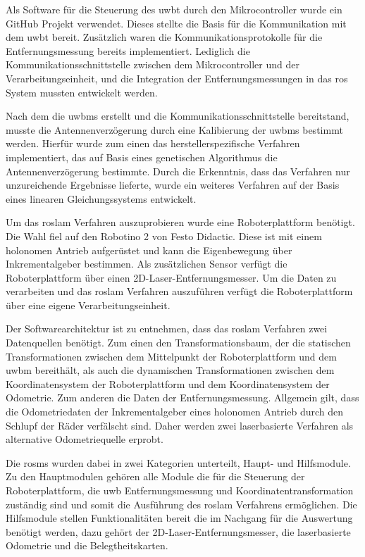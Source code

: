 Als Software für die Steuerung des \gls{uwbt} durch den Mikrocontroller wurde ein GitHub Projekt verwendet. Dieses stellte die Basis für die Kommunikation mit dem \gls{uwbt} bereit. Zusätzlich waren die Kommunikationsprotokolle für die Entfernungsmessung bereits implementiert. Lediglich die Kommunikationsschnittstelle zwischen dem Mikrocontroller und der Verarbeitungseinheit, und die Integration der Entfernungsmessungen in das \gls{ros} System mussten entwickelt werden.

Nach dem die \glspl{uwbm} erstellt und die Kommunikationsschnittstelle bereitstand, musste die Antennenverzögerung durch eine Kalibierung der \glspl{uwbm} bestimmt werden. Hierfür wurde zum einen das herstellerspezifische Verfahren implementiert, das auf Basis eines genetischen Algorithmus die Antennenverzögerung bestimmte. Durch die Erkenntnis, dass das Verfahren nur unzureichende Ergebnisse lieferte, wurde ein weiteres Verfahren auf der Basis eines linearen Gleichungssystems entwickelt.

Um das \gls{roslam} Verfahren auszuprobieren wurde eine Roboterplattform benötigt. Die Wahl fiel auf den Robotino 2 von Festo Didactic. Diese ist mit einem holonomen Antrieb aufgerüstet und kann die Eigenbewegung über Inkrementalgeber bestimmen. Als zusätzlichen Sensor verfügt die Roboterplattform über einen 2D-Laser-Entfernungsmesser. Um die Daten zu verarbeiten und das \gls{roslam} Verfahren auszuführen verfügt die Roboterplattform über eine eigene Verarbeitungseinheit.

Der Softwarearchitektur ist zu entnehmen, dass das \gls{roslam} Verfahren zwei Datenquellen benötigt. Zum einen den Transformationsbaum, der die statischen Transformationen zwischen dem Mittelpunkt der Roboterplattform und dem \gls{uwbm} bereithält, als auch die dynamischen Transformationen zwischen dem Koordinatensystem der Roboterplattform und dem Koordinatensystem der Odometrie. Zum anderen die Daten der Entfernungsmessung. Allgemein gilt, dass die Odometriedaten der Inkrementalgeber eines holonomen Antrieb durch den Schlupf der Räder verfälscht sind. Daher werden zwei laserbasierte Verfahren als alternative Odometriequelle erprobt.

Die \glspl{rosm} wurden dabei in zwei Kategorien unterteilt, Haupt- und Hilfsmodule. Zu den Hauptmodulen gehören alle Module die für die Steuerung der Roboterplattform, die \gls{uwb} Entfernungsmessung und Koordinatentransformation zuständig sind und somit die Ausführung des \gls{roslam} Verfahrens ermöglichen. Die Hilfsmodule stellen Funktionalitäten bereit die im Nachgang für die Auswertung benötigt werden, dazu gehört der 2D-Laser-Entfernungsmesser, die laserbasierte Odometrie und die Belegtheitskarten.

